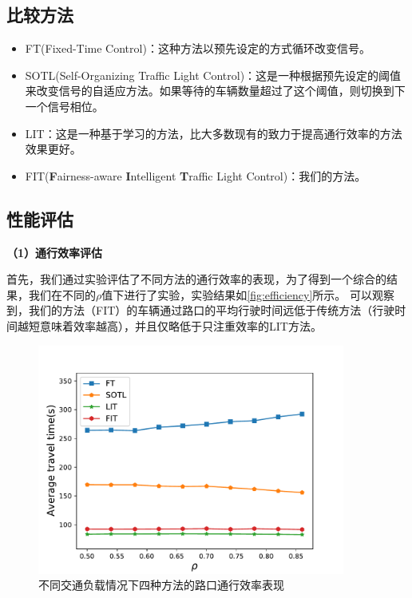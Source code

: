 \subsection{比较方法}
\begin{itemize}
    \item FT(Fixed-Time Control\cite{miller1963settings})：这种方法以预先设定的方式循环改变信号。
    \item SOTL(Self-Organizing Traffic Light Control\cite{cools2013self})：这是一种根据预先设定的阈值来改变信号的自适应方法。如果等待的车辆数量超过了这个阈值，则切换到下一个信号相位。
    \item LIT\cite{zheng2019diagnosing}：这是一种基于学习的方法，比大多数现有的致力于提高通行效率的方法效果更好。
    \item FIT(\textbf{F}airness-aware \textbf{I}ntelligent \textbf{T}raffic Light Control)：我们的方法。
\end{itemize}
\subsection{性能评估}

\textbf{（1）通行效率评估}

首先，我们通过实验评估了不同方法的通行效率的表现，为了得到一个综合的结果，我们在不同的$\rho$值下进行了实验，实验结果如\autoref{fig:efficiency}所示。
可以观察到，我们的方法（FIT）的车辆通过路口的平均行驶时间远低于传统方法（行驶时间越短意味着效率越高），并且仅略低于只注重效率的LIT方法。
\begin{figure}[htb]
    \includegraphics[width=0.9\textwidth]{fig/efficiency.pdf}
    \caption{不同交通负载情况下四种方法的路口通行效率表现}
    \label{fig:efficiency}
\end{figure}

